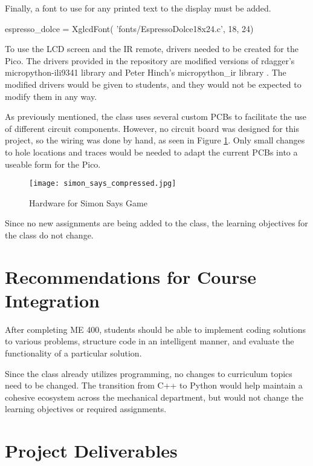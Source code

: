 \begin{tcolorbox}[breakable, enhanced jigsaw, title=ME 400: Assignment \ref{comp_app_assignment_1}, 
    colframe=ksu-purple, colback=ksu-gray]
Finally, a font to use for any printed text to the display must be added.

\begin{python}
espresso_dolce = XglcdFont(
    'fonts/EspressoDolce18x24.c', 18, 24)
\end{python}
\end{tcolorbox}

To use the LCD screen and the IR remote, drivers needed to be created for the Pico. 
The drivers provided in the repository are modified versions of
rdagger's micropython-ili9341 library \cite{micropython-ili9341} and Peter Hinch's 
micropython\_ir library \cite{micropython_ir2020}. The modified drivers would be given to 
students, and they would not be expected to modify them in any way.

As previously mentioned, the class uses several custom PCBs to facilitate the use
of different circuit components. However, no circuit board was designed for this 
project, so the wiring was done by hand, as seen in Figure \ref{fig:simon_says}. Only 
small changes to hole locations and traces would be needed to adapt the current PCBs 
into a useable form for the Pico.

\begin{figure}[h]
    \texttt{[image: simon\_says\_compressed.jpg]}
    \centering
    \caption{Hardware for Simon Says Game}
    \centering
    \label{fig:simon_says}
\end{figure}

Since no new assignments are being added to the class, the learning objectives for the 
class do not change.

\section{Recommendations for Course Integration}

After completing ME 400, students should be able to implement coding solutions to
various problems, structure code in an intelligent manner, and evaluate the functionality
of a particular solution. 

Since the class already utilizes programming, no changes to curriculum topics need to 
be changed. The transition from C++ to Python would help maintain a cohesive ecosystem
across the mechanical department, but would not change the learning objectives or required
assignments.

\section{Project Deliverables}

